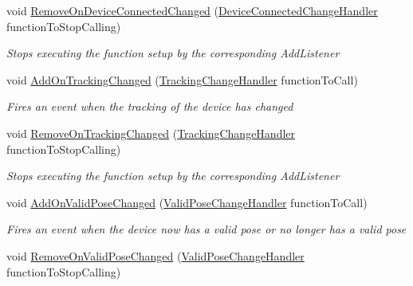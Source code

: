 \begin{DoxyCompactItemize}
void \mbox{\hyperlink{class_valve_1_1_v_r_1_1_steam_v_r___action___skeleton_a2079e2dfc22a35ec170188e84ef24567}{Remove\+On\+Device\+Connected\+Changed}} (\mbox{\hyperlink{class_valve_1_1_v_r_1_1_steam_v_r___action___skeleton_a737d68e8f67790bf838b4f5bac3ffae1}{Device\+Connected\+Change\+Handler}} function\+To\+Stop\+Calling)
\begin{DoxyCompactList}\small\item\em Stops executing the function setup by the corresponding Add\+Listener \end{DoxyCompactList}\item 
void \mbox{\hyperlink{class_valve_1_1_v_r_1_1_steam_v_r___action___skeleton_af5921e5234ffab73345554d65c335f2f}{Add\+On\+Tracking\+Changed}} (\mbox{\hyperlink{class_valve_1_1_v_r_1_1_steam_v_r___action___skeleton_a460bcda41aa359ec14435212bed2b856}{Tracking\+Change\+Handler}} function\+To\+Call)
\begin{DoxyCompactList}\small\item\em Fires an event when the tracking of the device has changed \end{DoxyCompactList}\item 
void \mbox{\hyperlink{class_valve_1_1_v_r_1_1_steam_v_r___action___skeleton_a3c47b5010ed77fe4d516ac3321778249}{Remove\+On\+Tracking\+Changed}} (\mbox{\hyperlink{class_valve_1_1_v_r_1_1_steam_v_r___action___skeleton_a460bcda41aa359ec14435212bed2b856}{Tracking\+Change\+Handler}} function\+To\+Stop\+Calling)
\begin{DoxyCompactList}\small\item\em Stops executing the function setup by the corresponding Add\+Listener \end{DoxyCompactList}\item 
void \mbox{\hyperlink{class_valve_1_1_v_r_1_1_steam_v_r___action___skeleton_a22c2be947605d84b1eb6f0742a882e4b}{Add\+On\+Valid\+Pose\+Changed}} (\mbox{\hyperlink{class_valve_1_1_v_r_1_1_steam_v_r___action___skeleton_af5ad5e815b7f555aa33ee8b74385e89e}{Valid\+Pose\+Change\+Handler}} function\+To\+Call)
\begin{DoxyCompactList}\small\item\em Fires an event when the device now has a valid pose or no longer has a valid pose \end{DoxyCompactList}\item 
void \mbox{\hyperlink{class_valve_1_1_v_r_1_1_steam_v_r___action___skeleton_a13f6b51dc671cd8dcf9b0063a7096ea9}{Remove\+On\+Valid\+Pose\+Changed}} (\mbox{\hyperlink{class_valve_1_1_v_r_1_1_steam_v_r___action___skeleton_af5ad5e815b7f555aa33ee8b74385e89e}{Valid\+Pose\+Change\+Handler}} function\+To\+Stop\+Calling)

\end{DoxyCompactItemize}
